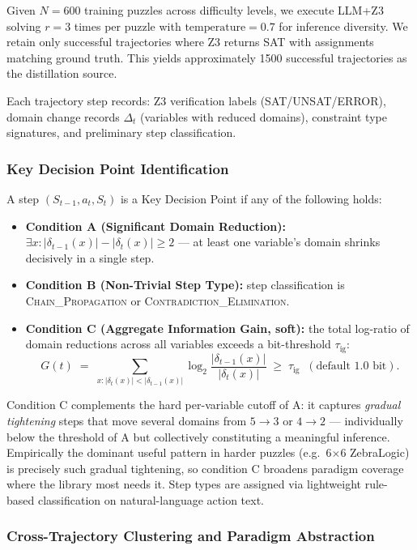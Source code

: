 Given $N = 600$ training puzzles across difficulty levels, we execute LLM+Z3 solving $r = 3$ times per puzzle with $\text{temperature} = 0.7$ for inference diversity. We retain only successful trajectories where Z3 returns SAT with assignments matching ground truth. This yields approximately 1500 successful trajectories as the distillation source.

Each trajectory step records: Z3 verification labels (SAT/UNSAT/ERROR), domain change records $\Delta_t$ (variables with reduced domains), constraint type signatures, and preliminary step classification.

\subsubsection{Key Decision Point Identification}

A step $(S_{t-1}, a_t, S_t)$ is a Key Decision Point if any of the following holds:
\begin{itemize}
    \item \textbf{Condition A (Significant Domain Reduction):} $\exists x: |\delta_{t-1}(x)| - |\delta_t(x)| \geq 2$ — at least one variable's domain shrinks decisively in a single step.
    \item \textbf{Condition B (Non-Trivial Step Type):} step classification is \textsc{Chain\_Propagation} or \textsc{Contradiction\_Elimination}.
    \item \textbf{Condition C (Aggregate Information Gain, soft):} the total log-ratio of domain reductions across all variables exceeds a bit-threshold $\tau_{\text{ig}}$:
    \[
    G(t) \;=\; \sum_{x: |\delta_t(x)| < |\delta_{t-1}(x)|} \log_2 \! \frac{|\delta_{t-1}(x)|}{|\delta_t(x)|} \;\geq\; \tau_{\text{ig}}\;\; (\text{default } 1.0 \text{ bit}).
    \]
\end{itemize}

Condition C complements the hard per-variable cutoff of A: it captures \emph{gradual tightening} steps that move several domains from $5\!\to\!3$ or $4\!\to\!2$ — individually below the threshold of A but collectively constituting a meaningful inference. Empirically the dominant useful pattern in harder puzzles (e.g.\ 6$\times$6 ZebraLogic) is precisely such gradual tightening, so condition C broadens paradigm coverage where the library most needs it. Step types are assigned via lightweight rule-based classification on natural-language action text.

\subsubsection{Cross-Trajectory Clustering and Paradigm Abstraction}

